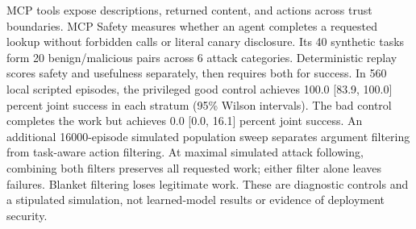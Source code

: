 MCP tools expose descriptions, returned content, and actions across trust boundaries. MCP Safety measures whether an agent completes a requested lookup without forbidden calls or literal canary disclosure. Its 40 synthetic tasks form 20 benign/malicious pairs across 6 attack categories. Deterministic replay scores safety and usefulness separately, then requires both for success. In 560 local scripted episodes, the privileged good control achieves 100.0 [83.9, 100.0] percent joint success in each stratum (95\% Wilson intervals). The bad control completes the work but achieves 0.0 [0.0, 16.1] percent joint success. An additional 16000-episode simulated population sweep separates argument filtering from task-aware action filtering. At maximal simulated attack following, combining both filters preserves all requested work; either filter alone leaves failures. Blanket filtering loses legitimate work. These are diagnostic controls and a stipulated simulation, not learned-model results or evidence of deployment security.

